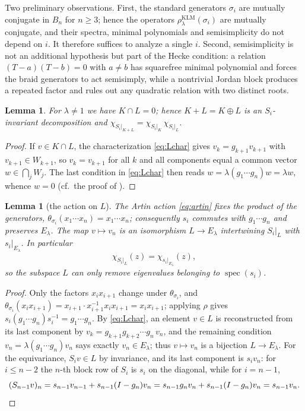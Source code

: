 \documentclass[11pt]{article}
\newtheorem{lemma}[theorem]{Lemma}
\theoremstyle{definition}
\theoremstyle{remark}
\newcommand{\spec}{\operatorname{spec}}
\newcommand{\rKLM}{\rho^{\mathrm{KLM}}_{\lambda}}
\begin{document}
Two preliminary observations. First, the standard generators $\sigma_i$
are mutually conjugate in $B_n$ for $n \geq 3$; hence the operators
$\rKLM(\sigma_i)$ are mutually conjugate, and their spectra, minimal
polynomials and semisimplicity do not depend on $i$. It therefore
suffices to analyze a single $i$. Second, semisimplicity is not an
additional hypothesis but part of the Hecke condition: a relation
$(T - a)(T - b) = 0$ with $a \neq b$ has squarefree minimal polynomial
and forces the braid generators to act semisimply, while a nontrivial
Jordan block produces a repeated factor and rules out any quadratic
relation with two distinct roots.

\begin{lemma}\label{lem:KL}
For $\lambda \neq 1$ we have $K \cap L = 0$; hence $K + L = K \oplus L$
is an $S_i$-invariant decomposition and
$\chi_{S_i|_{K+L}} = \chi_{S_i|_K}\, \chi_{S_i|_L}$.
\end{lemma}

\begin{proof}
If $v \in K \cap L$, the characterization \eqref{eq:Lchar} gives
$v_k = g_{k+1} v_{k+1}$ with $v_{k+1} \in W_{k+1}$, so
$v_k = v_{k+1}$ for all $k$ and all components equal a common vector
$w \in \bigcap_j W_j$. The last condition in \eqref{eq:Lchar} then reads
$w = \lambda (g_1 \cdots g_n) w = \lambda w$, whence $w = 0$
(cf.\ the proof of \cite[Theorem 16]{Negami25}).
\end{proof}

\begin{lemma}[the action on $L$]\label{lem:Laction}
The Artin action \eqref{eq:artin} fixes the product of the generators,
$\theta_{\sigma_i}(x_1 \cdots x_n) = x_1 \cdots x_n$; consequently
$s_i$ commutes with $g_1 \cdots g_n$ and preserves $E_{\lambda}$.
The map $v \mapsto v_n$ is an isomorphism $L \to E_{\lambda}$
intertwining $S_i|_L$ with $s_i|_{E_{\lambda}}$. In particular
\[
\chi_{S_i|_L}(z) = \chi_{s_i|_{E_{\lambda}}}(z),
\]
so the subspace $L$ can only remove eigenvalues belonging to
$\spec(s_i)$.
\end{lemma}

\begin{proof}
Only the factors $x_i x_{i+1}$ change under $\theta_{\sigma_i}$, and
$\theta_{\sigma_i}(x_i x_{i+1}) = x_{i+1} \cdot x_{i+1}^{-1} x_i x_{i+1}
= x_i x_{i+1}$; applying $\rho$ gives
$s_i (g_1 \cdots g_n) s_i^{-1} = g_1 \cdots g_n$.
By \eqref{eq:Lchar}, an element $v \in L$ is reconstructed from its last
component by $v_k = g_{k+1} g_{k+2} \cdots g_n\, v_n$, and the remaining
condition $v_n = \lambda(g_1 \cdots g_n) v_n$ says exactly
$v_n \in E_{\lambda}$; thus $v \mapsto v_n$ is a bijection
$L \to E_{\lambda}$. For the equivariance, $S_i v \in L$ by invariance,
and its last component is $s_i v_n$: for $i \leq n-2$ the $n$-th block
row of $S_i$ is $s_i$ on the diagonal, while for $i = n-1$,
\[
(S_{n-1} v)_n = s_{n-1} v_{n-1} + s_{n-1}(I - g_n) v_n
= s_{n-1} g_n v_n + s_{n-1}(I - g_n) v_n = s_{n-1} v_n. \qedhere
\]
\end{proof}
\end{document}
